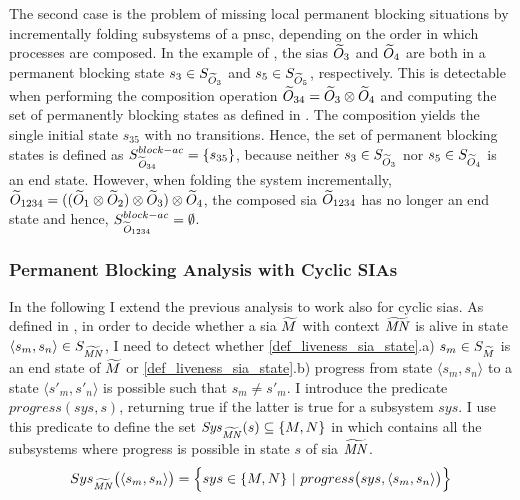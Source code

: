 The second case is the problem of missing local permanent blocking situations by incrementally folding subsystems of a \gls{pnsc}, depending on the order in which processes are composed.
In the example of \Fig{\ref{fig_pnsc_cycles}}, the \glspl{sia} $\widetilde{O}_3$ and $\widetilde{O}_4$ are both in a permanent blocking state $s_3 \in S_{\widetilde{O}_3}$ and $s_5 \in S_{\widetilde{O}_5}$, respectively.
This is detectable when performing the composition operation $\widetilde{O}_{34} = \widetilde{O}_3 \otimes \widetilde{O}_4$ and computing the set of permanently blocking states as defined in \Equ{\ref{eq_sia_block_end}}.
The composition yields the single initial state $s_{35}$ with no transitions.
Hence, the set of permanent blocking states is defined as $S_{\widetilde{\mathit{O}}_{34}}^{block-ac} = \{ s_{35} \}$, because neither $s_3 \in S_{\widetilde{O}_3}$ nor $s_5 \in S_{\widetilde{O}_4}$ is an end state.
However, when folding the system incrementally, \eg $\widetilde{O}_{1234} = ((\widetilde{O}_1 \otimes \widetilde{O}_2) \otimes \widetilde{O}_3) \otimes \widetilde{O}_4$, the composed \gls{sia} $\widetilde{O}_{1234}$ has no longer an end state and hence, $S_{\widetilde{\mathit{O}}_{1234}}^{block-ac} = \emptyset$.

\subsubsection{Permanent Blocking Analysis with Cyclic SIAs}
\label{sect_block_perm_c}
In the following I extend the previous analysis to work also for cyclic \glspl{sia}.
As defined in \Def{\ref{def_liveness_sia_state}}, in order to decide whether a \gls{sia} $\widetilde{M}$ with context $\widetilde{\mathit{MN}}$ is alive in state $\langle s_m, s_n \rangle \in S_{\widetilde{\mathit{MN}}}$, I need to detect whether \ref{def_liveness_sia_state}.a) $s_m \in S_{\widetilde{M}}$ is an end state of $\widetilde{M}$ or \ref{def_liveness_sia_state}.b) progress from state $\langle s_m, s_n \rangle$ to a state $\langle s'_m, s'_n \rangle$ is possible such that $s_m \neq s'_m$.
I introduce the predicate $progress( sys, s )$, returning true if the latter is true for a subsystem $sys$.
I use this predicate to define the set $\mathit{Sys}_{\widetilde{\mathit{MN}}}(s) \subseteq \{M, N\}$ in \Equ{\ref{eq_sia_sys_alive}} which contains all the subsystems where progress is possible in state $s$ of \gls{sia} $\widetilde{\mathit{MN}}$.
\begin{equation}
    \label{eq_sia_sys_alive}
    Sys_{\widetilde{\mathit{MN}}} \big ( \langle s_m, s_n \rangle \big ) = \Big \{ sys \in \{ M, N \} \ | \ progress \big ( sys, \langle s_m, s_n \rangle \big ) \Big \}
\end{equation}

